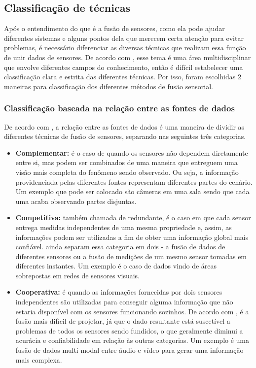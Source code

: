 \documentclass[acronym, symbols, table]{fei}
\begin{document}
		\subsection{Classificação de técnicas}
			Após o entendimento do que é a fusão de sensores, como ela pode ajudar diferentes sistemas e alguns pontos dela que merecem certa atenção para evitar problemas, é necessário diferenciar as diversas técnicas que realizam essa função de unir dados de sensores. De acordo com \textcite{castanedo2013review}, esse tema é uma área multidisciplinar que envolve diferentes campos do conhecimento, então é difícil estabelecer uma classificação clara e estrita das diferentes técnicas. Por isso, foram escolhidas 2 maneiras para classificação dos diferentes métodos de fusão sensorial.
			
			\subsubsection{Classificação baseada na relação entre as fontes de dados}
				De acordo com \textcite{castanedo2013review}, a relação entre as fontes de dados é uma maneira de dividir as diferentes técnicas de fusão de sensores, separando nas seguintes três categorias.
				
				\begin{itemize}
					\item \textbf{Complementar:} é o caso de quando os sensores não dependem diretamente entre si, mas podem ser combinados de uma maneira que entreguem uma visão mais completa do fenômeno sendo observado. Ou seja, a informação providenciada pelas diferentes fontes representam diferentes partes do cenário. Um exemplo que pode ser colocado são câmeras em uma sala sendo que cada uma acaba observando partes disjuntas.
					
					\item \textbf{Competitiva:} também chamada de redundante, é o caso em que cada sensor entrega medidas independentes de uma mesma propriedade e, assim, as informações podem ser utilizadas a fim de obter uma informação global mais confiável. \textcite{visser1999organisation} ainda separam essa categoria em dois - a fusão de dados de diferentes sensores ou a fusão de medições de um mesmo sensor tomadas em diferentes instantes. Um exemplo é o caso de dados vindo de áreas sobrepostas em redes de sensores visuais.
					
					\item \textbf{Cooperativa:} é quando as informações fornecidas por dois sensores independentes são utilizadas para conseguir alguma informação que não estaria disponível com os sensores funcionando sozinhos. De acordo com \textcite{brooks1998multi}, é a fusão mais difícil de projetar, já que o dado resultante está suscetível a problemas de todos os sensores sendo fundidos, o que geralmente diminui a acurácia e confiabilidade em relação às outras categorias. Um exemplo é uma fusão de dados multi-modal entre áudio e vídeo para gerar uma informação mais complexa.
				\end{itemize}
			
\end{document}
